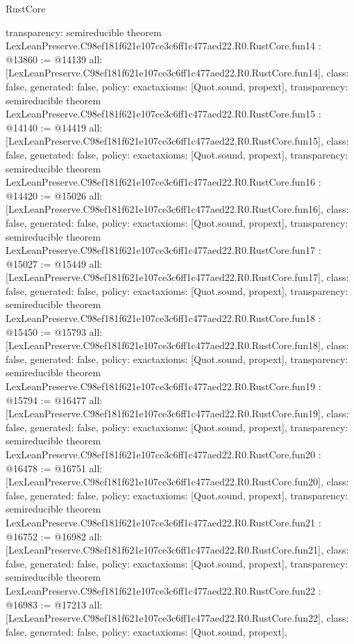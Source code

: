 \begin{lexlean}{RustCore}
\begin{coremodule}
{  transparency: semireducible
}
theorem LexLeanPreserve.C98ef181f621e107ce3c6ff1c477aed22.R0.RustCore.fun14 : @13860 := @14139 {
  all: [LexLeanPreserve.C98ef181f621e107ce3c6ff1c477aed22.R0.RustCore.fun14],
  class: false,
  generated: false,
  policy: exact{axioms: [Quot.sound, propext]},
  transparency: semireducible
}
theorem LexLeanPreserve.C98ef181f621e107ce3c6ff1c477aed22.R0.RustCore.fun15 : @14140 := @14419 {
  all: [LexLeanPreserve.C98ef181f621e107ce3c6ff1c477aed22.R0.RustCore.fun15],
  class: false,
  generated: false,
  policy: exact{axioms: [Quot.sound, propext]},
  transparency: semireducible
}
theorem LexLeanPreserve.C98ef181f621e107ce3c6ff1c477aed22.R0.RustCore.fun16 : @14420 := @15026 {
  all: [LexLeanPreserve.C98ef181f621e107ce3c6ff1c477aed22.R0.RustCore.fun16],
  class: false,
  generated: false,
  policy: exact{axioms: [Quot.sound, propext]},
  transparency: semireducible
}
theorem LexLeanPreserve.C98ef181f621e107ce3c6ff1c477aed22.R0.RustCore.fun17 : @15027 := @15449 {
  all: [LexLeanPreserve.C98ef181f621e107ce3c6ff1c477aed22.R0.RustCore.fun17],
  class: false,
  generated: false,
  policy: exact{axioms: [Quot.sound, propext]},
  transparency: semireducible
}
theorem LexLeanPreserve.C98ef181f621e107ce3c6ff1c477aed22.R0.RustCore.fun18 : @15450 := @15793 {
  all: [LexLeanPreserve.C98ef181f621e107ce3c6ff1c477aed22.R0.RustCore.fun18],
  class: false,
  generated: false,
  policy: exact{axioms: [Quot.sound, propext]},
  transparency: semireducible
}
theorem LexLeanPreserve.C98ef181f621e107ce3c6ff1c477aed22.R0.RustCore.fun19 : @15794 := @16477 {
  all: [LexLeanPreserve.C98ef181f621e107ce3c6ff1c477aed22.R0.RustCore.fun19],
  class: false,
  generated: false,
  policy: exact{axioms: [Quot.sound, propext]},
  transparency: semireducible
}
theorem LexLeanPreserve.C98ef181f621e107ce3c6ff1c477aed22.R0.RustCore.fun20 : @16478 := @16751 {
  all: [LexLeanPreserve.C98ef181f621e107ce3c6ff1c477aed22.R0.RustCore.fun20],
  class: false,
  generated: false,
  policy: exact{axioms: [Quot.sound, propext]},
  transparency: semireducible
}
theorem LexLeanPreserve.C98ef181f621e107ce3c6ff1c477aed22.R0.RustCore.fun21 : @16752 := @16982 {
  all: [LexLeanPreserve.C98ef181f621e107ce3c6ff1c477aed22.R0.RustCore.fun21],
  class: false,
  generated: false,
  policy: exact{axioms: [Quot.sound, propext]},
  transparency: semireducible
}
theorem LexLeanPreserve.C98ef181f621e107ce3c6ff1c477aed22.R0.RustCore.fun22 : @16983 := @17213 {
  all: [LexLeanPreserve.C98ef181f621e107ce3c6ff1c477aed22.R0.RustCore.fun22],
  class: false,
  generated: false,
  policy: exact{axioms: [Quot.sound, propext]},
}
\end{coremodule}
\end{lexlean}
